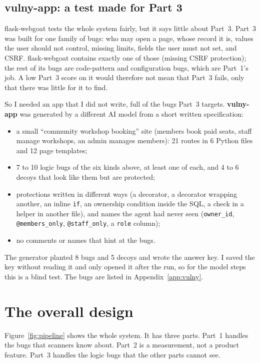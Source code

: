 \documentclass[11pt,a4paper]{article}
\newcommand{\code}[1]{\texttt{#1}}
\begin{document}
\subsection{vulny-app: a test made for Part 3}
flask-webgoat tests the whole system fairly, but it says little about Part~3. Part~3 was built for one family of
bugs: who may open a page, whose record it is, values the user should not control, missing limits, fields the user
must not set, and CSRF. flask-webgoat contains exactly one of those (missing CSRF protection); the rest of its bugs
are code-pattern and configuration bugs, which are Part~1's job. A low Part~3 score on it would therefore not mean
that Part~3 fails, only that there was little for it to find.

So I needed an app that I did not write, full of the bugs Part~3 targets. \textbf{vulny-app} was generated by a
different AI model from a short written specification:
\begin{itemize}
  \item a small ``community workshop booking'' site (members book paid seats, staff manage workshops, an admin
        manages members): 21 routes in 6 Python files and 12 page templates;
  \item 7 to 10 logic bugs of the six kinds above, at least one of each, and 4 to 6 decoys that look like them but
        are protected;
  \item protections written in different ways (a decorator, a decorator wrapping another, an inline \code{if}, an
        ownership condition inside the SQL, a check in a helper in another file), and names the agent had never seen
        (\code{owner\_id}, \code{@members\_only}, \code{@staff\_only}, a \code{role} column);
  \item no comments or names that hint at the bugs.
\end{itemize}
The generator planted 8 bugs and 5 decoys and wrote the answer key. I saved the key without reading it and only
opened it after the run, so for the model steps this is a blind test. The bugs are listed in
Appendix~\ref{app:vulny}.

\section{The overall design}

Figure~\ref{fig:pipeline} shows the whole system. It has three parts. Part~1 handles the bugs that scanners
know about. Part~2 is a measurement, not a product feature. Part~3 handles the logic bugs that the other
parts cannot see.
\end{document}
